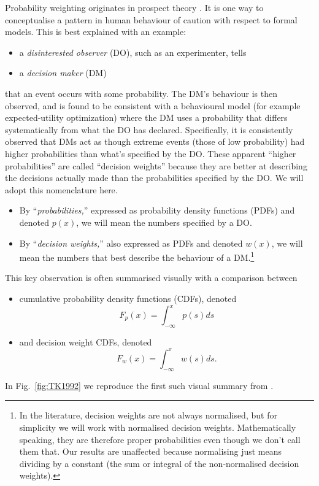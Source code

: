 \documentclass[%
	11pt,
	abstract=true,	
	bibliography=oldstyle					%
]{scrartcl}
\newcommand{\fref}[1]{Fig.~\ref{fig:#1}}
\newcommand{\be}{\begin{equation}}
\newcommand{\ee}{\end{equation}}
\newcommand{\bi}{\begin{itemize}}
\newcommand{\ei}{\end{itemize}}
\numberwithin{equation}{section}
\begin{document}
Probability weighting originates in prospect theory \parencite{Barberis2013}. It is one way to conceptualise a pattern in human behaviour of caution with respect to formal models. This is best explained with an example:  
\bi
	\item a \textit{disinterested observer} (DO), such as an experimenter, tells
	\item a \textit{decision maker} (DM) 
\ei
that an event occurs with some probability. The DM's behaviour is then observed, and is found to be consistent with a behavioural model (for example expected-utility optimization) where the DM uses a probability that differs systematically from what the DO has declared.
% 
Specifically, it is consistently observed that DMs act as though extreme events (those of low probability) had higher probabilities than what's specified by the DO. These apparent ``higher probabilities'' are called ``decision weights'' because they are better at describing the decisions actually made than the probabilities specified by the DO. We will adopt this nomenclature here. 
\bi
	\item By ``\textit{probabilities,}'' expressed as probability density functions (PDFs) and denoted $p(x)$, we will mean the numbers specified by a DO.
	\item By ``\textit{decision weights,}'' also expressed as PDFs and denoted $w(x)$, we will mean the numbers that best describe the behaviour of a DM.\footnote{In the literature, decision weights are not always normalised, but for simplicity we will work with normalised decision weights. Mathematically speaking, they are therefore proper probabilities even though we don't call them that. Our results are unaffected because normalising just means dividing by a constant (the sum or integral of the non-normalised decision weights).}
\ei

This key observation is often summarised visually with a comparison between 
\bi
	\item cumulative probability density functions (CDFs), denoted 
% 
\be
	F_p(x)=\int_{-\infty}^x p(s) ds
\ee
%
	\item and decision weight CDFs, denoted
% 
\be
	F_w(x)=\int_{-\infty}^x w(s) ds.
\ee
\ei
In \fref{TK1992} we reproduce the first such visual summary from \textcite{TverskyKahneman1992}.
\end{document}
